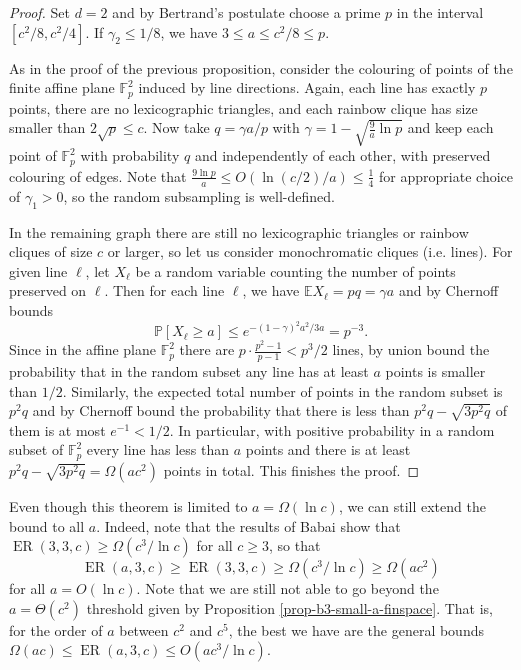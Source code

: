 \documentclass[11pt]{article}
\theoremstyle{plain}
\theoremstyle{definition}
\newcommand{\offerado}[3]{\operatorname{ER}(#1,#2,#3)}
\newcommand{\expect}{\mathbb{E}}
\newcommand{\prob}{\mathbb{P}}
\begin{document}
\begin{proof}
    Set $d=2$ and by Bertrand's postulate choose a prime $p$ in the interval $[c^2/8, c^2/4]$. If $\gamma_2\leq 1/8$, we have $3\le a\le c^2/8\le p$.

    As in the proof of the previous proposition, consider the colouring of points of the finite affine plane $\mathbb{F}_p^2$ induced by line directions. Again, each line has exactly $p$ points, there are no lexicographic triangles, and each rainbow clique has size smaller than $2\sqrt{p}\le c$. Now take $q=\gamma a/p$ with $\gamma=1-\sqrt{\frac{9}{a}\ln p}$ and keep each point of $\mathbb{F}_p^2$ with probability $q$ and independently of each other, with preserved colouring of edges. Note that $\frac{9\ln p}{a}\le O(\ln(c/2)/a)\le\frac{1}{4}$ for appropriate choice of $\gamma_1>0$, so the random subsampling is well-defined.
    
    In the remaining graph there are still no lexicographic triangles or rainbow cliques of size $c$ or larger, so let us consider monochromatic cliques (i.e. lines). For given line $\ell$, let $X_{\ell}$ be a random variable counting the number of points preserved on $\ell$. Then for each line $\ell$, we have $\expect X_\ell=pq=\gamma a$ and by Chernoff bounds 
    $$\prob\left[ X_\ell\ge a \right]\le e^{-(1-\gamma)^2a^2/3a}=p^{-3}.$$
    Since in the affine plane $\mathbb{F}_p^2$ there are $p\cdot\frac{p^2-1}{p-1}<p^{3}/2$ lines, by union bound the probability that in the random subset any line has at least $a$ points is smaller than $1/2$. Similarly, the expected total number of points in the random subset is $p^2q$ and by Chernoff bound the probability that there is less than $p^2q-\sqrt{3p^2q}$ of them is at most $e^{-1}<1/2$. In particular, with positive probability in a random subset of $\mathbb{F}_p^2$ every line has less than $a$ points and there is at least $p^2q-\sqrt{3p^2q}=\Omega(ac^2)$ points in total. This finishes the proof.
\end{proof}

Even though this theorem is limited to $a=\Omega(\ln c)$, we can still extend the bound to all $a$. Indeed, note that the results of Babai \cite{babai1985anti} show that $\offerado{3}{3}{c}\ge \Omega(c^3/\ln c)$ for all $c\ge 3$, so that
$$\offerado{a}{3}{c}\ge \offerado{3}{3}{c}\ge \Omega(c^3/\ln c)\ge \Omega(ac^2)$$
for all $a=O(\ln c)$.  Note that we are still not able to go beyond the $a=\Theta(c^2)$ threshold given by Proposition \ref{prop-b3-small-a-finspace}. That is, for the order of $a$ between $c^2$ and $c^5$, the best we have are the general bounds $\Omega(ac)\le \offerado{a}{3}{c}\le O(ac^3/\ln c)$.
\end{document}
